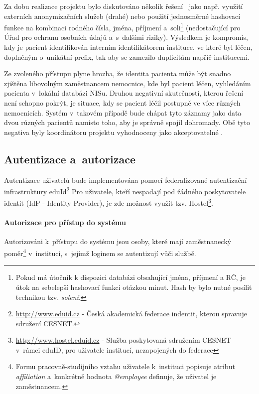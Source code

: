 \documentclass[11pt,draft,oneside]{fithesis2}
\begin{document}
Za dobu realizace projektu bylo diskutováno několik řešení~\cite{ARCH_2014_1_25} jako např. využití externích anonymizačních služeb (drahé) nebo použití jednosměrné hashovací funkce na kombinaci rodného čísla, jména, příjmení a~soli\footnote{Pokud má útočník k dispozici databázi obsahující jména, příjmení a RČ, je útok  na sebelepší hashovací funkci otázkou minut. Hash by bylo nutné posílit technikou tzv. \textit{solení}.} (nedostačující pro Úřad pro ochranu osobních údajů a~s~dalšími riziky). 
Výsledkem je kompromis, kdy je pacient identifikován interním identifikátorem instituce, ve které byl léčen, doplněným o~unikátní prefix, tak aby se zamezilo duplicitám napříč institucemi.

Ze zvoleného přístupu plyne hrozba, že identita pacienta může být snadno zjištěna libovolným zaměstnancem nemocnice, kde byl pacient léčen, vyhledáním pacienta v~lokální databázi NISu. Druhou negativní skutečností, kterou řešení není schopno pokrýt, je situace, kdy se pacient léčil postupně ve více různých nemocnicích. Systém v~takovém případě bude chápat tyto záznamy jako data dvou různých pacientů namísto toho, aby je správně spojil dohromady. Obě tyto negativa byly koordinátoru projektu vyhodnoceny jako akceptovatelné .

\subsection{Autentizace a~autorizace}
Autentizace uživatelů bude implementována pomocí federalizované autentizační infrastruktury eduId\footnote{\url{http://www.eduid.cz} - Česká akademická federace indentit, kterou spravuje sdružení CESNET.} Pro uživatele, kteří nespadají pod žádného poskytovatele identit (IdP - Identity Provider), je zde možnost využít tzv. Hostel\footnote{\url{http://www.hostel.eduid.cz} - Služba poskytovaná sdružením CESNET v~rámci eduID, pro uživatele institucí, nezapojených do federace}. 

\paragraph*{Autorizace pro přístup do systému}
Autorizováni k~přístupu do systému jsou osoby, které mají zaměstnanecký poměr\footnote{Formu pracovně-studijního vztahu uživatele k~instituci popisuje atribut \textit{affiliation} a~konkrétně hodnota \textit{@employee} definuje, že uživatel je zaměstnancem.} v~instituci, s~jejímž loginem se autentizují vůči službě.
\end{document}
